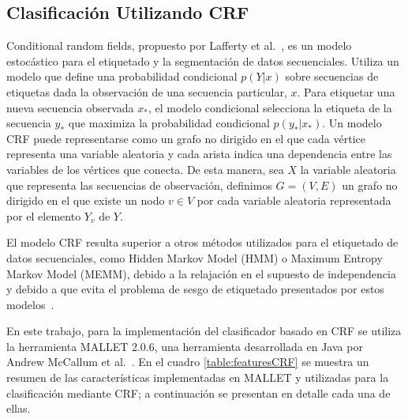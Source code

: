 \documentclass[runningheads,a4paper]{llncs}
\begin{document}
\subsection{Clasificación Utilizando CRF}
\label{sec:CRF}

Conditional random fields, propuesto por Lafferty et al.~\cite{LAFFERTY01}, es un modelo estocástico para el etiquetado y la segmentación de datos secuenciales. Utiliza un modelo que define una probabilidad condicional $p(Y|x)$ sobre secuencias de etiquetas dada la observación de una secuencia particular, $x$. Para etiquetar una nueva secuencia observada $x_*$, el modelo condicional selecciona la etiqueta de la secuencia $y_*$ que maximiza la probabilidad condicional $p(y_*|x_*)$. Un modelo CRF puede representarse como un grafo no dirigido en el que cada vértice representa una variable aleatoria y cada arista indica una dependencia entre las variables de los vértices que conecta. De esta manera, sea $X$ la variable aleatoria que representa las secuencias de observaci\'on, definimos $G=(V,E)$ un grafo no dirigido en el que existe un nodo $v \in V$ por cada variable aleatoria representada por el elemento $Y_v$ de $Y$. 

El modelo CRF resulta superior a otros métodos utilizados para el etiquetado de datos secuenciales, como Hidden Markov Model (HMM) o Maximum Entropy Markov Model (MEMM), debido a la relajación en el supuesto de independencia y debido a que evita el problema de sesgo de etiquetado presentados por estos modelos~\cite{WALLACH04}.

En este trabajo, para la implementación del clasificador basado en CRF se utiliza la herramienta MALLET 2.0.6, una herramienta desarrollada en Java por Andrew McCallum et al.~\cite{MCCALLUM02}. En el cuadro \ref{table:featuresCRF} se muestra un resumen de las características implementadas en MALLET y utilizadas para la clasificación mediante CRF; a continuación se presentan en detalle cada una de ellas.
\end{document}
